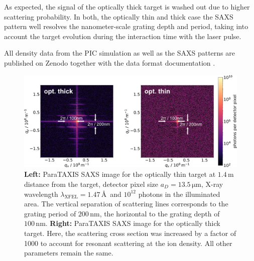 As expected, the signal of the optically thick target is washed out due to
higher scattering probability. In both, the optically thin and thick case the
SAXS pattern well resolves the nanometer-scale grating depth and period, taking
into account the target evolution during the interaction time with the laser
pulse.

All density data from the PIC simulation as well as the SAXS patterns are
published on Zenodo together with the data format documentation
\cite{Garten2017}.

\begin{figure}
\centering
  \includegraphics[width=.99\linewidth]{figures/scattering_images_v2.png}
\caption{
\textbf{Left:} ParaTAXIS SAXS image for the optically thin target at
$1.4\,\mathrm{m}$ distance from the target, detector pixel size $a_D =
13.5\,\mathrm{\mu m}$, X-ray wavelength $\lambda_\mathrm{XFEL} = 1.47\,$\AA\ and
$10^{12}$ photons in the illuminated area. The vertical separation of scattering
lines corresponds to the grating period of $200\,\mathrm{nm}$, the horizontal to
the grating depth of $100\,\mathrm{nm}$.
\textbf{Right:} ParaTAXIS SAXS image for the optically thick target. Here, the
scattering cross section was increased by a factor of 1000 to account for
resonant scattering at the ion density. All other parameters remain the same.  }
  \label{fig:scattering}
\end{figure}



